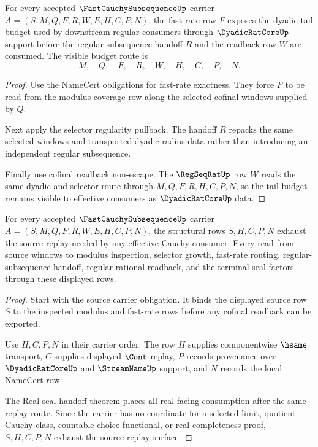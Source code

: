 \begin{theorem}
\label{thm:fast-cauchy-subsequence-dyadic-tail-budget}
For every accepted $\FastCauchySubsequenceUp$ carrier $A=(S,M,Q,F,R,W,E,H,C,P,N)$, the fast-rate row $F$ exposes the dyadic tail budget used by downstream regular consumers through $\DyadicRatCoreUp$ support before the regular-subsequence handoff $R$ and the readback row $W$ are consumed. The visible budget route is
$$
M,\quad Q,\quad F,\quad R,\quad W,\quad H,\quad C,\quad P,\quad N.
$$
\end{theorem}
\begin{proof}
Use the NameCert obligations for fast-rate exactness. They force $F$ to be read from the modulus coverage row along the selected cofinal windows supplied by $Q$.

Next apply the selector regularity pullback. The handoff $R$ repacks the same selected windows and transported dyadic radius data rather than introducing an independent regular subsequence.

Finally use cofinal readback non-escape. The $\RegSeqRatUp$ row $W$ reads the same dyadic and selector route through $M,Q,F,R,H,C,P,N$, so the tail budget remains visible to effective consumers as $\DyadicRatCoreUp$ data.
\end{proof}

\begin{theorem}
\label{thm:fast-cauchy-subsequence-source-replay-exhaustion}
For every accepted $\FastCauchySubsequenceUp$ carrier $A=(S,M,Q,F,R,W,E,H,C,P,N)$, the structural rows $S,H,C,P,N$ exhaust the source replay needed by any effective Cauchy consumer. Every read from source windows to modulus inspection, selector growth, fast-rate routing, regular-subsequence handoff, regular rational readback, and the terminal seal factors through these displayed rows.
\end{theorem}
\begin{proof}
Start with the source carrier obligation. It binds the displayed source row $S$ to the inspected modulus and fast-rate rows before any cofinal readback can be exported.

Use $H,C,P,N$ in their carrier order. The row $H$ supplies componentwise $\hsame$ transport, $C$ supplies displayed $\Cont$ replay, $P$ records provenance over $\DyadicRatCoreUp$ and $\StreamNameUp$ support, and $N$ records the local NameCert row.

The Real-seal handoff theorem places all real-facing consumption after the same replay route. Since the carrier has no coordinate for a selected limit, quotient Cauchy class, countable-choice functional, or real completeness proof, $S,H,C,P,N$ exhaust the source replay surface.
\end{proof}


